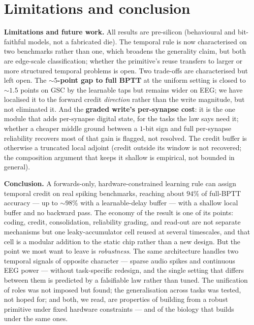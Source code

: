 \documentclass[11pt]{article}
\begin{document}
\hypertarget{sec:conclusion}{%
\section{Limitations and conclusion}\label{sec:conclusion}}

\textbf{Limitations and future work.} All results are pre-silicon
(behavioural and bit-faithful models, not a fabricated die). The
temporal rule is now characterised on two benchmarks rather than one,
which broadens the generality claim, but both are edge-scale
classification; whether the primitive's reuse transfers to larger or
more structured temporal problems is open. Two trade-offs are
characterised but left open. The \textbf{\({\sim}5\)-point gap to full
BPTT} at the uniform setting is closed to \({\sim}1.5\) points on GSC by
the learnable taps but remains wider on EEG; we have localised it to the
forward credit \emph{direction} rather than the write magnitude, but not
eliminated it. And the \textbf{graded write's per-synapse cost}: it is
the one module that adds per-synapse digital state, for the tasks the
law says need it; whether a cheaper middle ground between a \(1\)-bit
sign and full per-synapse reliability recovers most of that gain is
flagged, not resolved. The credit buffer is otherwise a truncated local
adjoint (credit outside its window is not recovered; the composition
argument that keeps it shallow is empirical, not bounded in general).

\textbf{Conclusion.} A forwards-only, hardware-constrained learning rule
can assign temporal credit on real spiking benchmarks, reaching about
\(94\%\) of full-BPTT accuracy --- up to \({\sim}98\%\) with a
learnable-delay buffer --- with a shallow local buffer and no backward
pass. The economy of the result is one of its points: coding, credit,
consolidation, reliability grading, and read-out are not separate
mechanisms but one leaky-accumulator cell reused at several timescales,
and that cell is a modular addition to the static chip rather than a new
design. But the point we most want to leave is \emph{robustness}. The
same architecture handles two temporal signals of opposite character ---
sparse audio spikes and continuous EEG power --- without task-specific
redesign, and the single setting that differs between them is predicted
by a falsifiable law rather than tuned. The unification of roles was not
imposed but found; the generalisation across tasks was tested, not hoped
for; and both, we read, are properties of building from a robust
primitive under fixed hardware constraints --- and of the biology that
builds under the same ones.
\end{document}
